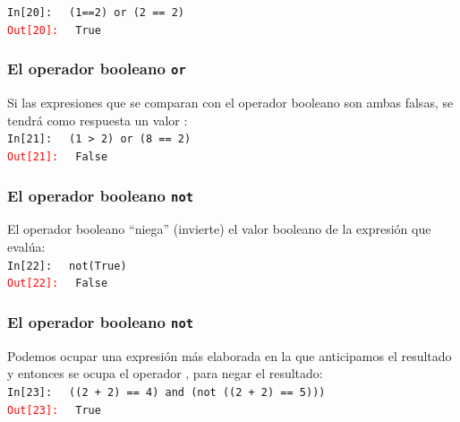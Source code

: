\documentclass[12pt]{beamer}
\begin{document}
{\begin{frame}[fragile]
\bigskip
\pause
\textcolor{ao}{\texttt{In[20]: }} \verb| (1==2) or (2 == 2)| \\
\pause
\textcolor{red}{\texttt{Out[20]: }} \verb| True|
\end{frame}
\begin{frame}[fragile]
\frametitle{El operador booleano \texttt{or}}
Si las expresiones que se comparan con el operador booleano  son ambas falsas, se tendrá como respuesta un valor :
\\
\bigskip
\pause
\textcolor{ao}{\texttt{In[21]: }} \verb| (1 > 2) or (8 == 2)| \\
\pause
\textcolor{red}{\texttt{Out[21]: }} \verb| False|
\end{frame}
\begin{frame}[fragile]
\frametitle{El operador booleano \texttt{not}}
El operador booleano  \enquote{niega} (invierte) el valor booleano de la expresión que evalúa:
\\
\bigskip
\pause
\textcolor{ao}{\texttt{In[22]: }} \verb| not(True)| \\
\pause
\textcolor{red}{\texttt{Out[22]: }} \verb| False|
\end{frame}
\begin{frame}[fragile]
\frametitle{El operador booleano \texttt{not}}
Podemos ocupar una expresión más elaborada en la que anticipamos el resultado y entonces se ocupa el operador , para negar el resultado:
\\
\bigskip
\pause
\textcolor{ao}{\texttt{In[23]: }} \verb| ((2 + 2) == 4) and (not ((2 + 2) == 5)))| \\
\pause
\textcolor{red}{\texttt{Out[23]: }} \verb| True|
\end{frame}
}
\end{document}

